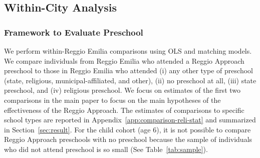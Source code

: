 \subsection{Within-City Analysis} \label{sec:within-city-analysis}

\subsubsection{Framework to Evaluate Preschool}
\label{subsubsection:OLS-Preschool}

We perform within-Reggio Emilia comparisons using OLS and matching models. We compare individuals from Reggio Emilia who attended a Reggio Approach preschool to those in Reggio Emilia who attended (i) any other type of preschool (state, religious, municipal-affiliated, and other), (ii) no preschool at all, (iii) state preschool, and (iv) religious preschool. We focus on estimates of the first two comparisons in the main paper to focus on the main hypotheses of the effectiveness of the Reggio Approach. The estimates of comparisons to specific school types are reported in Appendix~\ref{app:comparison-reli-stat} and summarized in Section~\ref{sec:result}. For the child cohort (age 6), it is not possible to compare Reggio Approach preschools with no preschool because the sample of individuals who did not attend preschool is so small (See Table~\ref{tab:sample}).

